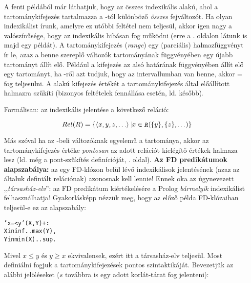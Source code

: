 A fenti példából már láthatjuk, hogy az összes indexikális  alakú, ahol a  tartománykifejezés tartalmazza a
-tól különböző \emph{összes} fejváltozót. Ha olyan indexikálist
írunk, amelyre ez utóbbi feltétel nem teljesül, akkor igen nagy a valószínűsége,
hogy az indexikális hibásan fog működni (erre a \pageref{hibas_indexikalis}. oldalon
látunk is majd egy példát). A  tartománykifejezés (\emph{range})
egy (parciális) halmazfüggvényt ír le, azaz a benne szereplő változók tartományának
függvényében egy újabb tartományt állít elő. Például a  kifejezés
az  alsó határának függvényében állít elő egy tartományt, ha -ről azt
tudjuk, hogy az  intervallumban van benne, akkor  = 
fog teljesülni. A  alakú kifejezés 
értékét a  tartománykifejezés által előállított halmazra szűkíti (bizonyos
feltételek fennállása esetén, ld. később). 

Formálisan: az  indexikális jelentése a következő
reláció:

\[
Rel(R) =  \{ \tuple{x,y,z, \ldots} | x \in \parbox{0.6em}{\tt\em R}(\{y\},\{z\}, \ldots)\}
\]

Más szóval ha az -beli változóknak egyelemű a tartománya, akkor az
 tartománykifejezés értéke \emph{pontosan} az adott relációt kielégítő 
értékek halmaza lesz (ld. még a pont-szűkítés definícióját, \pageref{pontszukites}. oldal).
\br
{\bf Az FD predikátumok alapszabálya:} az egy FD-klózon belül lévő indexikálisok
jelentésének (azaz az általuk definiált relációnak) azonosnak kell lennie! Ennek oka
az úgynevezett ,,\emph{társasház-elv}'': az FD predikátum kiértékelésére a Prolog
\emph{bármelyik} indexikálist felhasználhatja! Gyakorlásképp nézzük meg, hogy az előző
példa FD-klózaiban teljesül-e ez az alapszabály:

\begin{alltt}
'x=<y'(X, Y) +: 
    X in inf..max(Y), % \(\{\tuple{x,y}|x\in{}\cd{inf..max(\{}y\cd{\})}\} \equiv \{\tuple{x,y}|x\in{}(-\infty,y]\} \equiv \{\tuple{x,y}|x\leq{}y\}\)
    Y in min(X)..sup. % \(\{\tuple{x,y}|y\in{}\cd{min(\{}x\cd{\})..sup}\} \equiv \{\tuple{x,y}|y\in{}[x,+\infty)\} \equiv \{\tuple{x,y}|y\geq{}x\}\)
\end{alltt}

Mivel $x \leq y$ és $y \geq x$ ekvivalensek, ezért itt a társasház-elv teljesül.
\br
Most definiálni fogjuk a tartománykifejezések pontos szintaktikáját. Bevezetjük az
alábbi jelöléseket ($s$ továbbra is egy adott korlát-tárat fog jelenteni):

